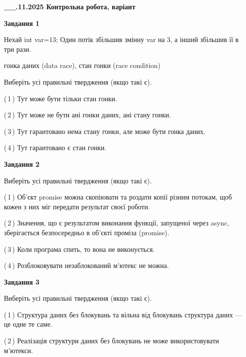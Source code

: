 \documentclass[12pt, ukrainian]{article}
\begin{document}
\begin {large}

\textbf{\_\_.11.2025 Контрольна робота, варіант  }\par


{

\begin{center}
\textbf{Завдання 1}
\end{center}
Нехай int var=13; Один потік збільшив змінну var на 3, а інший збільшив її в три рази.

гонка даних (data race), стан гонки (race condition)

Виберіть усі правильні твердження (якщо такі є).\par
\vspace{2mm}
(\,1\,) Тут може бути тільки стан гонки.%

(\,2\,) Тут може не бути ані гонки даних, ані стану гонки.%

(\,3\,) Тут гарантовано нема стану гонки, але може бути гонка даних.%

(\,4\,) Тут гарантовано є стан гонки.%



\begin{center}
\textbf{Завдання 2}
\end{center}
Виберіть усі правильні твердження (якщо такі є).\par
\vspace{2mm}

(\,1\,) Об’єкт promise можна скопіювати та роздати копії різним потокам, щоб кожен з них міг передати результат своєї роботи.%

(\,2\,) Значення, що є результатом виконання функції, запущеної через async, зберігається безпосередньо в об’єкті проміза (promise).%

(\,3\,) Коли програма спить, то вона не виконується.%

(\,4\,) Розблоковувати незаблокований м’ютекс не можна.%



\begin{center}
\textbf{Завдання 3}
\end{center}
Виберіть усі правильні твердження (якщо такі є).\par
\vspace{2mm}

(\,1\,) Структура даних без блокувань та вільна від блокувань структура даних --- це одне те саме.%

(\,2\,) Реалізація структури даних без блокувань не може використовувати м’ютекси.%

}
\end{large}
\end{document}
